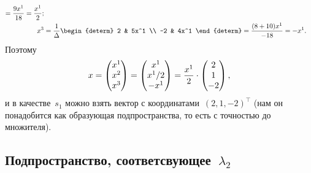 \begin{solution}
\begin{align*}
			=
			\frac{9x^1}{18}
			=
			\frac{x^1}{2}
			;
			\\
			x^3 &=
			\frac{1}{\Delta}
			\begin{determ}
				 2 & 5x^1 \\
				-2 & 4x^1
			\end{determ}
			=
			\frac{(8+10)x^1}{-18}
			=
			-x^1
			.
		\end{align*}
		Поэтому
		\[
			x =
			\begin{pmatrix}x^1 \\ x^2 \\ x^3\end{pmatrix}
			=
			\begin{pmatrix}x^1 \\ x^1/2 \\ -x^1\end{pmatrix}
			=
			\frac{x^1}{2} \cdot
			\begin{pmatrix}2 \\ 1 \\ -2\end{pmatrix}
			,
		\]
		и в качестве~$s_1$ можно взять вектор с координатами~$(2, 1, -2)^\top$ (нам он понадобится как образующая подпространства, то есть с точностью до множителя).

	\subsection[Подпространство, соответсвующее~$\lambda_2$]{Подпространство, соответсвующее~$\lambda_2$}


\end{solution}
